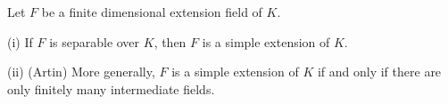 Let $F$ be a finite dimensional extension field of $K$.

(i) If $F$ is separable over $K$, then $F$ is a simple extension of $K$.

(ii) (Artin) More generally, $F$ is a simple extension of $K$ if and only if there are only finitely many intermediate fields.
